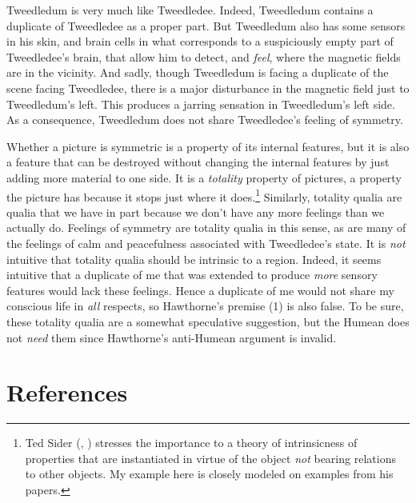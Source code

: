 \documentclass[
  11pt,
  letterpaper,
  DIV=11,
  numbers=noendperiod,
  twoside]{scrartcl}
\begin{document}
Tweedledum is very much like Tweedledee. Indeed, Tweedledum contains a
duplicate of Tweedledee as a proper part. But Tweedledum also has some
sensors in his skin, and brain cells in what corresponds to a
suspiciously empty part of Tweedledee's brain, that allow him to detect,
and \emph{feel}, where the magnetic fields are in the vicinity. And
sadly, though Tweedledum is facing a duplicate of the scene facing
Tweedledee, there is a major disturbance in the magnetic field just to
Tweedledum's left. This produces a jarring sensation in Tweedledum's
left side. As a consequence, Tweedledum does not share Tweedledee's
feeling of symmetry.

Whether a picture is symmetric is a property of its internal features,
but it is also a feature that can be destroyed without changing the
internal features by just adding more material to one side. It is a
\emph{totality} property of pictures, a property the picture has because
it stops just where it does.\footnote{Ted Sider
  (, )
  stresses the importance to a theory of intrinsicness of properties
  that are instantiated in virtue of the object \emph{not} bearing
  relations to other objects. My example here is closely modeled on
  examples from his papers.} Similarly, totality qualia are qualia that
we have in part because we don't have any more feelings than we actually
do. Feelings of symmetry are totality qualia in this sense, as are many
of the feelings of calm and peacefulness associated with Tweedledee's
state. It is \emph{not} intuitive that totality qualia should be
intrinsic to a region. Indeed, it seems intuitive that a duplicate of me
that was extended to produce \emph{more} sensory features would lack
these feelings. Hence a duplicate of me would not share my conscious
life in \emph{all} respects, so Hawthorne's premise (1) is also false.
To be sure, these totality qualia are a somewhat speculative suggestion,
but the Humean does not \emph{need} them since Hawthorne's anti-Humean
argument is invalid.

\section*{References}\label{references}
\end{document}
